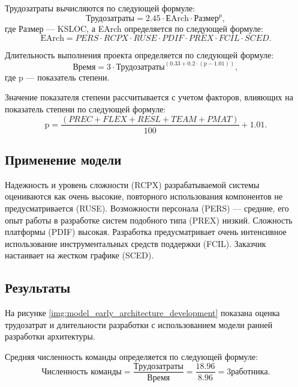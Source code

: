 \documentclass{bmstu}
\begin{document}
Трудозатраты вычисляются по следующей формуле:
\begin{equation}
    \text{Трудозатраты} = 2.45 \cdot \text{ЕArch} \cdot \text{Размер}^{p},
\end{equation}
где Размер --- KSLOC, а EArch определяется по следующей формуле:
\begin{equation}
    \text{EArch} = PERS \cdot RCPX \cdot RUSE \cdot PDIF \cdot PREX \cdot FCIL \cdot SCED.
\end{equation}

Длительность выполнения проекта определяется по следующей формуле:
\begin{equation}
    \text{Время} = 3 \cdot \text{Трудозатраты}^{(0.33 + 0.2 \cdot (p - 1.01))},
\end{equation}
где p --- показатель степени. 

Значение показателя степени рассчитывается с учетом факторов, влияющих на показатель степени по следующей формуле:
\begin{equation}
    \text{p} = \frac{(PREC + FLEX + RESL + TEAM + PMAT)}{100} + 1.01.
\end{equation}

\clearpage

\subsection*{Применение модели}

Надежность и уровень сложности (RCPX) разрабатываемой системы оцениваются как очень высокие, повторного использования компонентов не предусматривается (RUSE). Возможности персонала (PERS) --- средние, его опыт работы в разработке систем подобного типа (PREX) низкий. Сложность платформы (PDIF) высокая. Разработка предусматривает очень интенсивное использование инструментальных средств поддержки (FCIL). Заказчик настаивает на жестком графике (SCED).

\subsection*{Результаты}

На рисунке \ref{img:model_early_architecture_development} показана оценка трудозатрат и длительности разработки с использованием модели ранней разработки архитектуры.


Средняя численность команды определяется по следующей формуле:
\begin{equation}
    \text{Численность команды} = \frac{Трудозатраты}{Время} = \frac{18.96}{8.96} = 3 работника.
\end{equation}
\end{document}

